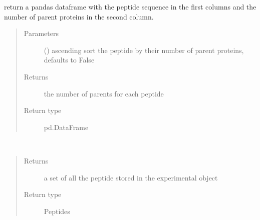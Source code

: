 \documentclass[letterpaper,10pt,english]{sphinxmanual}
\begin{document}
\begin{fulllineitems}
\begin{fulllineitems}
\label{\detokenize{IPTK.Classes:IPTK.Classes.Experiment.Experiment.get_peptide_number_parent}}
return a pandas dataframe with the peptide sequence in the first columns and the 
number of parent proteins in the second column.
\begin{quote}\begin{description}
\item[{Parameters}] \leavevmode
{} (\sphinxstyleliteralemphasis{\sphinxupquote{, }}) \textendash{} ascending sort the peptide by their number of parent proteins, defaults to False

\item[{Returns}] \leavevmode
the number of parents for each peptide

\item[{Return type}] \leavevmode
pd.DataFrame

\end{description}\end{quote}

\end{fulllineitems}


\begin{fulllineitems}
\label{\detokenize{IPTK.Classes:IPTK.Classes.Experiment.Experiment.get_peptides}}~\begin{quote}\begin{description}
\item[{Returns}] \leavevmode
a set of all the peptide stored in the experimental object

\item[{Return type}] \leavevmode
Peptides

\end{description}\end{quote}


\end{fulllineitems}
\end{fulllineitems}
\end{document}
